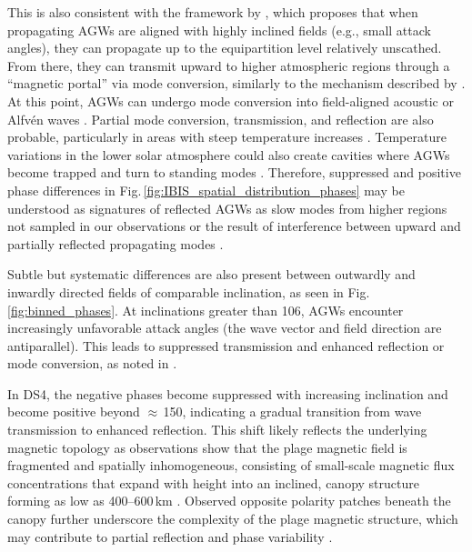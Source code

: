 \documentclass[preprint2,linenumbers]{aastex701}
\begin{document}
This is also consistent with the framework by \citet{2009_Newington_Cally, 2011_Newington_Cally}, which proposes that when propagating AGWs are aligned with highly inclined fields (e.g., small attack angles), they can propagate up to the equipartition level relatively unscathed.
From there, they can transmit upward to higher atmospheric regions through a ``magnetic portal'' via mode conversion, similarly to the mechanism described by \citet{2006_Jefferies_McIntosh_etal}.
At this point, AGWs can undergo mode conversion into field-aligned acoustic or Alfvén waves \citep{2011_Newington_Cally_Proceeding}.
Partial mode conversion, transmission, and reflection are also probable, particularly in areas with steep temperature increases \citep{2012_Khomenko_Cally, 2012_Felipe}.
Temperature variations in the lower solar atmosphere could also create cavities where AGWs become trapped and turn to standing modes \citep{2016_Hague_Erdelyi}.
Therefore, suppressed and positive phase differences in Fig.\,\ref{fig:IBIS_spatial_distribution_phases} may be understood as signatures of reflected AGWs as slow modes from higher regions not sampled in our observations or the result of interference between upward and partially reflected propagating modes \citep{2009_Newington_Cally, 2012_Felipe}.

Subtle but systematic differences are also present between outwardly and inwardly directed fields of comparable inclination, as seen in Fig.\,\ref{fig:binned_phases}.
At inclinations greater than 106\textdegree, AGWs encounter increasingly unfavorable attack angles (the wave vector and field direction are antiparallel).
This leads to suppressed transmission and enhanced reflection or mode conversion, as noted in \citet{2009_Newington_Cally, 2024_Cally_Bogdan}.

In DS4, the negative phases become suppressed with increasing inclination and become positive beyond $\approx$\,150\textdegree, indicating a gradual transition from wave transmission to enhanced reflection.
This shift likely reflects the underlying magnetic topology as observations show that the plage magnetic field is fragmented and spatially inhomogeneous, consisting of small-scale magnetic flux concentrations that expand with height into an inclined, canopy structure forming as low as 400--600\,km \citep{2015_Buehler_Lagg_Solanki_vanNoort, 2020_Morosin_delaCruzRodriguez_Vissers_Yadav}.
Observed opposite polarity patches beneath the canopy further underscore the complexity of the plage magnetic structure, which may contribute to partial reflection and phase variability \citep{2025_Liu_etal}.
\end{document}
